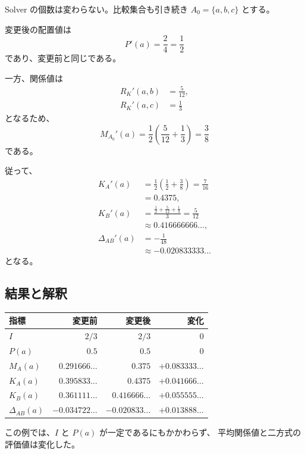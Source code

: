 \documentclass[a4paper,11pt]{ltjsarticle}
\begin{document}
Solver の個数は変わらない。比較集合も引き続き
$A_0=\{a,b,c\}$ とする。

変更後の配置値は
\begin{equation}
  P'(a)=\frac24=\frac12
\end{equation}
であり、変更前と同じである。

一方、関係値は
\begin{align}
  R_K'(a,b)&=\frac5{12},\\
  R_K'(a,c)&=\frac13
\end{align}
となるため、
\begin{equation}
  M_{A_0}'(a)
  =
  \frac12\left(\frac5{12}+\frac13\right)
  =\frac38
\end{equation}
である。

従って、
\begin{align}
  K_A'(a)
  &=\frac12\left(\frac12+\frac38\right)
    =\frac7{16}\\
  &=0.4375,\\
  K_B'(a)
  &=\frac{\frac12+\frac5{12}+\frac13}{3}
    =\frac5{12}\\
  &\approx0.416666666\ldots,\\
  \Delta_{AB}'(a)
  &=-\frac1{48}\\
  &\approx-0.020833333\ldots
\end{align}
となる。

\subsection{結果と解釈}

\begin{center}
\begin{tabular}{lrrr}
\toprule
指標 & 変更前 & 変更後 & 変化\\
\midrule
$I$ & $2/3$ & $2/3$ & $0$\\
$P(a)$ & $0.5$ & $0.5$ & $0$\\
$M_A(a)$ & $0.291666\ldots$ & $0.375$ & $+0.083333\ldots$\\
$K_A(a)$ & $0.395833\ldots$ & $0.4375$ & $+0.041666\ldots$\\
$K_B(a)$ & $0.361111\ldots$ & $0.416666\ldots$ & $+0.055555\ldots$\\
$\Delta_{AB}(a)$ & $-0.034722\ldots$ & $-0.020833\ldots$ & $+0.013888\ldots$\\
\bottomrule
\end{tabular}
\end{center}

この例では、$I$ と $P(a)$ が一定であるにもかかわらず、
平均関係値と二方式の評価値は変化した。
\end{document}
